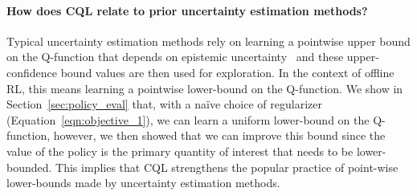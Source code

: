 \paragraph{How does CQL relate to prior uncertainty estimation methods?} Typical uncertainty estimation methods rely on learning a pointwise upper bound on the Q-function that depends on epistemic uncertainty~\citep{jaksch2010near,osband2017posterior} and these upper-confidence bound values are then used for exploration. In the context of offline RL, this means learning a pointwise lower-bound on the Q-function. We show in Section~\ref{sec:policy_eval} that, with a na\"ive choice of regularizer (Equation~\ref{eqn:objective_1}), we can learn a uniform lower-bound on the Q-function, however, we then showed that we can improve this bound since the value of the policy is the primary quantity of interest that needs to be lower-bounded. This implies that CQL strengthens the popular practice of point-wise lower-bounds made by uncertainty estimation methods.


